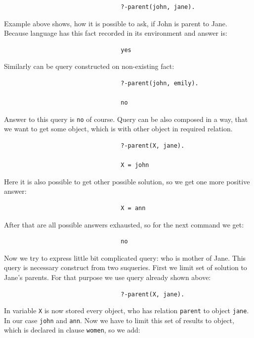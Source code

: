 \documentclass[11pt,twoside,a4paper]{book}
\begin{document}
\begin{verbatim}
                                 ?-parent(john, jane).
\end{verbatim}
Example above shows, how it is possible to ask, if John is parent to Jane.
Because language has this fact recorded in its environment and answer is:

\begin{verbatim}                            
                                 yes
\end{verbatim}
Similarly can be query constructed on non-existing fact:

\begin{verbatim}
                                 ?-parent(john, emily).
                            
                                 no
\end{verbatim}
Answer to this query is \verb|no| of course. Query can be also composed in a
way, that we want to get some object, which is with other object in
required relation.

\begin{verbatim}
                                 ?-parent(X, jane).
                            
                                 X = john
\end{verbatim}
Here it is also possible to get other possible solution, so we get one more
positive answer:

\begin{verbatim}
                                 X = ann
\end{verbatim}
\newpage
After that are all possible answers exhausted, so for the next command we get:

\begin{verbatim}
                                 no
\end{verbatim}
Now we try to express little bit complicated query: who is mother of Jane. This
query is necessary construct from two suqueries. First we limit set of solution
to Jane's parents. For that purpose we use query already shown above:

\begin{verbatim}
                                 ?-parent(X, jane).
\end{verbatim}




In variable \verb|X| is now stored every object, who has relation \verb|parent|
to object \verb|jane|. In our case \verb|john| and \verb|ann|. Now we have to
limit this set of results to object, which is declared in clause \verb|women|,
so we add:
\end{document}
